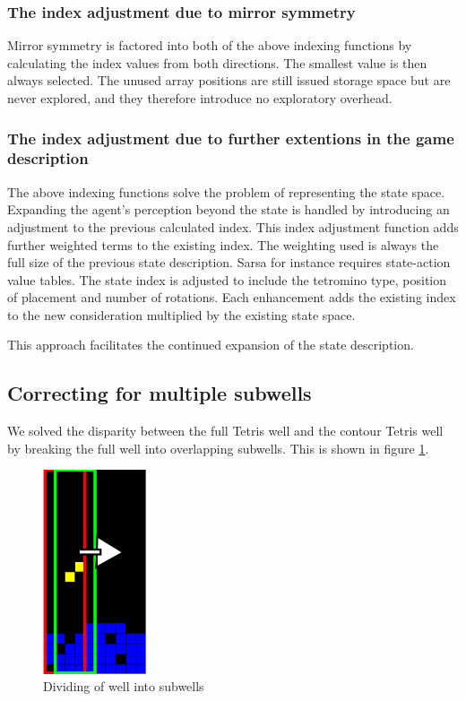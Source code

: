 \documentclass{rucsthesis}
\begin{document}
\subsubsection{The index adjustment due to mirror symmetry}

Mirror symmetry is factored into both of the above indexing functions by calculating the index values from both directions. The smallest value is then always selected. The unused array positions are still issued storage space but are never explored, and they therefore introduce no exploratory overhead.

\subsubsection{The index adjustment due to further extentions in the game description}

The above indexing functions solve the problem of representing the state space. Expanding the agent's perception beyond the state is handled by introducing an adjustment to the previous calculated index. This index adjustment function adds further weighted terms to the existing index. The weighting used is always the full size of the previous state description. Sarsa for instance requires state-action value tables. The state index is adjusted to include the tetromino type, position of placement and number of rotations. Each enhancement adds the existing index to the new consideration multiplied by the existing state space.

This approach facilitates the continued expansion of the state description. 
 
\subsection{Correcting for multiple subwells}

We solved the disparity between the full Tetris well and the contour Tetris well by breaking the full well into overlapping subwells. This is shown in figure \ref{fig:subwells}.

\begin{figure}[h]
\centering
\includegraphics[width=1.2in]{decomposedwell.png}
\caption{Dividing of well into subwells}
\label{fig:subwells}
\end{figure}
\end{document}
